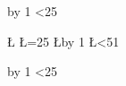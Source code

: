 \documentclass[luatex,fontsize=8pt,paper=b4,twoside,report,landscape]{jlreq}%
\begin{document}
\begin{multicols*}{3}
  \noindent {}\vskip2mm
  \begin{ansbox*}[height=8mm,Schar=1]
    \newcount\K
     \loop
    \advance\K by 1
    \ifnum\K<25
    \repeat
  \end{ansbox*}
  \columnbreak
  \begin{ansbox*}[height=8mm,Schar=1,Snum=26]
    \newcount\L
    \L=25 \loop
    \advance\L by 1
    \ifnum\L<51
    \repeat
  \end{ansbox*}
  \columnbreak
  \noindent {}\vskip2mm
  \begin{ansbox*}[height=8mm,Schar=1]
    \newcount\K
     \loop
    \advance\K by 1
    \ifnum\K<25
    \repeat
  \end{ansbox*}
\end{multicols*}
\end{document}
